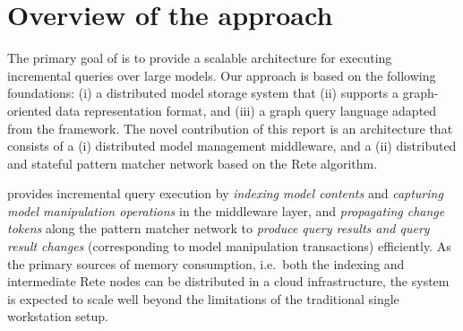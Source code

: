 \chapter{Overview of the approach}
\label{chap:overview}

The primary goal of \iqd{} is to provide a scalable architecture for executing incremental queries over large models. Our approach is based on the following foundations: (i) a distributed model storage system that (ii) supports a graph-oriented data representation format, and (iii) a graph query language adapted from the \eiq{} framework. The novel contribution of this report is an architecture that consists of a (i) distributed model management middleware, and a (ii) distributed and stateful pattern matcher network based on the Rete algorithm.

\iqd{} provides incremental query execution by \emph{indexing model contents} and \emph{capturing model manipulation operations} in the middleware layer, and \emph{propagating change tokens} along the pattern matcher network to \emph{produce query results and query result changes} (corresponding to model manipulation transactions) efficiently. As the primary sources of memory consumption, i.e.\ both the indexing and intermediate Rete nodes can be distributed in a cloud infrastructure, the system is expected to scale well beyond the limitations of the traditional single workstation setup.





